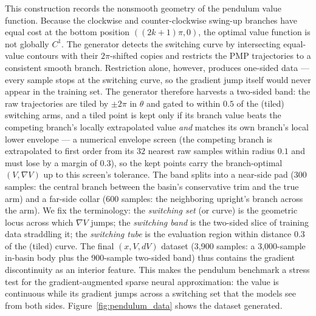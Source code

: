 \documentclass[11pt]{amsart}
\theoremstyle{definition}
\theoremstyle{remark}
\begin{document}
This construction records the nonsmooth geometry of the pendulum value function.
Because the clockwise and counter-clockwise swing-up branches have equal cost at the bottom position $((2k+1)\pi,0)$, the optimal value function is not globally $C^1$.
The generator detects the switching curve by intersecting equal-value contours with their $2\pi$-shifted copies and restricts the PMP trajectories to a consistent smooth branch.
Restriction alone, however, produces one-sided data --- every sample stops at the switching curve, so the gradient jump itself would never appear in the training set.
The generator therefore harvests a two-sided band: the raw trajectories are tiled by $\pm 2\pi$ in $\theta$ and gated to within $0.5$ of the (tiled) switching arms, and a tiled point is kept only if its branch value beats the competing branch's locally extrapolated value \emph{and} matches its own branch's local lower envelope --- a numerical envelope screen (the competing branch is extrapolated to first order from its $32$ nearest raw samples within radius $0.1$ and must lose by a margin of $0.3$), so the kept points carry the branch-optimal $(V,\nabla V)$ up to this screen's tolerance.
The band splits into a near-side pad ($300$ samples: the central branch between the basin's conservative trim and the true arm) and a far-side collar ($600$ samples: the neighboring upright's branch across the arm).
We fix the terminology: the \emph{switching set} (or curve) is the geometric locus across which $\nabla V$ jumps; the \emph{switching band} is the two-sided slice of training data straddling it; the \emph{switching tube} is the evaluation region within distance $0.3$ of the (tiled) curve.
The final $(x,V,dV)$ dataset (3{,}900 samples: a 3{,}000-sample in-basin body plus the 900-sample two-sided band) thus contains the gradient discontinuity as an interior feature.
This makes the pendulum benchmark a stress test for the gradient-augmented sparse neural approximation: the value is continuous while its gradient jumps across a switching set that the models see from both sides.
Figure~\ref{fig:pendulum_data} shows the dataset generated. 
\end{document}
